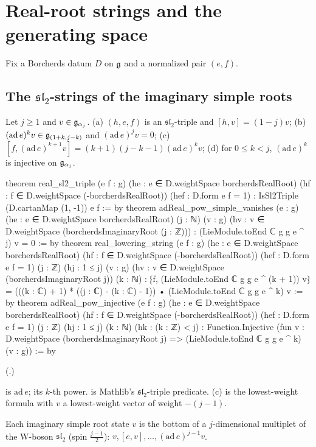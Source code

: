 \section{Real-root strings and the generating space}\label{ch18:sec:strings}

Fix a Borcherds datum $D$ on $\mathfrak{g}$ and a normalized pair $(e,f)$.

\subsection{\texorpdfstring{The $\mathfrak{sl}_2$-strings of the imaginary simple roots}{The sl2-strings of the imaginary simple roots}}

\begin{theorem}\label{ch18:thm:sl2}
Let $j\ge1$ and $v\in\mathfrak{g}_{\alpha_j}$.  (a) $(h,e,f)$ is an $\mathfrak{sl}_2$-triple and $[h,v]=(1-j)v$; (b) $(\mathrm{ad}\,e)^kv\in\mathfrak{g}_{(1+k,j-k)}$ and
$(\mathrm{ad}\,e)^jv=0$; (c) $[f,(\mathrm{ad}\,e)^{k+1}v]=(k+1)(j-k-1)(\mathrm{ad}\,e)^kv$; (d) for $0\le k<j$, $(\mathrm{ad}\,e)^k$ is injective on
$\mathfrak{g}_{\alpha_j}$.
\end{theorem}
\begin{leancode}
theorem real_sl2_triple (e f : g)
    (he : e ∈ D.weightSpace borcherdsRealRoot)
    (hf : f ∈ D.weightSpace (-borcherdsRealRoot)) (hef : D.form e f = 1) :
    IsSl2Triple (D.cartanMap (1, -1)) e f := by
theorem adReal_pow_simple_vanishes (e : g) (he : e ∈ D.weightSpace borcherdsRealRoot)
    (j : ℕ) (v : g) (hv : v ∈ D.weightSpace (borcherdsImaginaryRoot (j : ℤ))) :
    (LieModule.toEnd ℂ g g e ^ j) v = 0 := by
theorem real_lowering_string (e f : g)
    (he : e ∈ D.weightSpace borcherdsRealRoot)
    (hf : f ∈ D.weightSpace (-borcherdsRealRoot)) (hef : D.form e f = 1)
    (j : ℤ) (hj : 1 ≤ j) (v : g)
    (hv : v ∈ D.weightSpace (borcherdsImaginaryRoot j)) (k : ℕ) :
    ⁅f, (LieModule.toEnd ℂ g g e ^ (k + 1)) v⁆ =
      (((k : ℂ) + 1) * ((j : ℂ) - (k : ℂ) - 1)) •
        (LieModule.toEnd ℂ g g e ^ k) v := by
theorem adReal_pow_injective (e f : g)
    (he : e ∈ D.weightSpace borcherdsRealRoot)
    (hf : f ∈ D.weightSpace (-borcherdsRealRoot)) (hef : D.form e f = 1)
    (j : ℤ) (hj : 1 ≤ j) (k : ℕ) (hk : (k : ℤ) < j) :
    Function.Injective (fun v : D.weightSpace (borcherdsImaginaryRoot j) =>
      (LieModule.toEnd ℂ g g e ^ k) (v : g)) := by
\end{leancode}
(.)
\begin{dictionary}
 is $\mathrm{ad}\,e$;  its $k$-th power.   is Mathlib's
$\mathfrak{sl}_2$-triple predicate.  (c) is the lowest-weight formula with $v$ a lowest-weight vector of weight $-(j-1)$.
\end{dictionary}
\begin{physics}
Each imaginary simple root state $v$ is the bottom of a $j$-dimensional multiplet of the W-boson $\mathfrak{sl}_2$ (spin
$\frac{j-1}2$): $v,[e,v],\dots,(\mathrm{ad}\,e)^{j-1}v$.
\end{physics}
